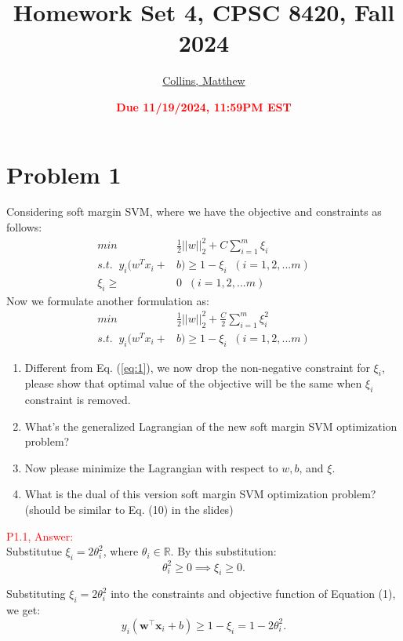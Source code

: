 \documentclass[11pt]{article}
\title{{\bf Homework Set 4, CPSC 8420, Fall 2024}} %
\author{\Large\underline{Collins, Matthew}}
\date{\textbf{\Large\textcolor{red}{Due 11/19/2024, 11:59PM EST}}} %
\begin{document}
\maketitle

\section*{Problem 1}
Considering soft margin SVM, where we have the objective and constraints as follows:
\begin{equation}\label{eq:1}
	\begin{aligned}
		min\;\; &\frac{1}{2}||w||_2^2 +C\sum\limits_{i=1}^{m}\xi_i\\s.t.  \;\; y_i(w^Tx_i + &b)  \geq 1 - \xi_i \;\;(i =1,2,...m)\\\xi_i \geq &0 \;\;(i =1,2,...m)
	\end{aligned}
\end{equation}
Now we formulate another formulation as:
\begin{equation}
	\begin{aligned}
		min\;\; &\frac{1}{2}||w||_2^2 +\frac{C}{2}\sum\limits_{i=1}^{m}\xi_i^2\\s.t.  \;\; y_i(w^Tx_i + &b)  \geq 1 - \xi_i \;\;(i =1,2,...m)
	\end{aligned}
\end{equation}
\begin{enumerate}
	\item Different from Eq. (\ref{eq:1}), we now drop the non-negative constraint for $\xi_i$, please show that optimal value of the objective will be the same when $\xi_i$ constraint is removed.
	\item What's the generalized Lagrangian of the new soft margin SVM optimization problem?
	\item Now please minimize the Lagrangian with respect to $w, b$, and $\xi$.
	\item What is the dual of this version soft margin SVM optimization problem? (should be similar to Eq. (10) in the slides)
\end{enumerate}

\textcolor{red}{P1.1, Answer:}\\

Substitutue \( \xi_i = 2\theta_i^2 \), where \( \theta_i \in \mathbb{R} \). By this substitution:
\[
\theta_i^2 \geq 0 \implies \xi_i \geq 0.
\]

Substituting \( \xi_i = 2\theta_i^2 \) into the constraints and objective function of Equation (1), we get:
\[
y_i (\mathbf{w}^\top \mathbf{x}_i + b) \geq 1 - \xi_i = 1 - 2\theta_i^2.
\]
\end{document}
